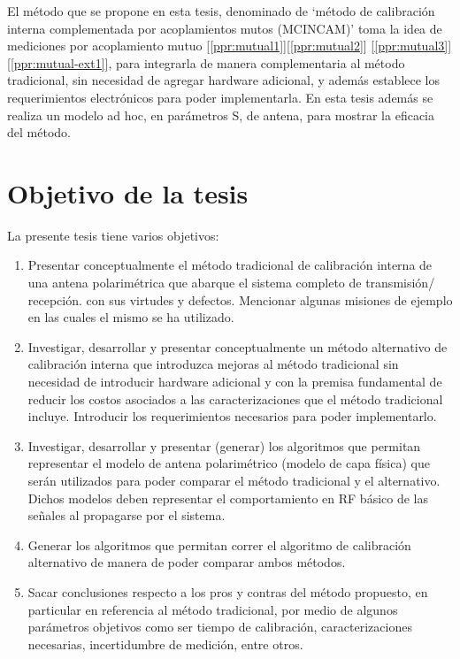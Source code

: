 \documentclass[a4paper,10pt]{article}
\begin{document}
El método que se propone en esta tesis, denominado de \enquote*{método de 
calibración interna complementada por acoplamientos mutos (MCINCAM)} toma la 
idea de mediciones por acoplamiento mutuo [\ref{ppr:mutual1}][\ref{ppr:mutual2}]
[\ref{ppr:mutual3}][\ref{ppr:mutual-ext1}], para integrarla de manera 
complementaria al método tradicional, sin necesidad de agregar hardware 
adicional, y además establece los requerimientos electrónicos para poder 
implementarla. En esta tesis además se realiza un modelo ad hoc, en parámetros 
S, de antena, para mostrar la eficacia del método. 


\section{Objetivo de la tesis}

La presente tesis tiene varios objetivos:

\begin{enumerate}
    \item Presentar conceptualmente el método tradicional de calibración interna
de una antena polarimétrica que abarque el sistema completo de transmisión/
recepción. con sus virtudes y defectos. Mencionar algunas misiones de ejemplo en
las cuales el mismo se ha utilizado.
    \item Investigar, desarrollar y presentar conceptualmente un método 
alternativo de calibración interna que introduzca mejoras al método tradicional 
sin necesidad de introducir hardware adicional y con la premisa fundamental de 
reducir los costos asociados a las caracterizaciones que el método tradicional 
incluye. Introducir los requerimientos necesarios para poder implementarlo.
    \item Investigar, desarrollar y presentar (generar) los algoritmos que 
permitan representar el modelo de antena polarimétrico (modelo de capa física) 
que serán utilizados para poder comparar el método tradicional y el alternativo.
Dichos modelos deben representar el comportamiento en RF básico de las señales 
al propagarse por el sistema.
    \item Generar los algoritmos que permitan correr el algoritmo de calibración
alternativo de manera de poder comparar ambos métodos.
    \item Sacar conclusiones respecto a los pros y contras del método propuesto,
en particular en referencia al método tradicional, por medio de algunos 
parámetros objetivos como ser tiempo de calibración, caracterizaciones 
necesarias, incertidumbre de medición, entre otros.
\end{enumerate}    
\end{document}

